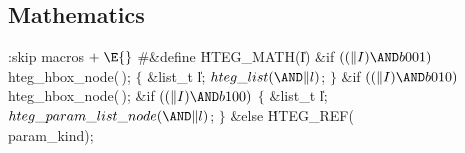 

\subsection{Mathematics}
\noindent
\Y\B\4:skip macros\X${}\mathrel+\E{}$\6
\8\#\&{define} \.{HTEG\_MATH}(\|I) \6
\&{if} ${}((\|I)\AND\\{b001}){}$\1\5
\\{hteg\_hbox\_node}(\,);\2\1\6
\4${}\{{}$\5
\&{list\_t} \|l;\5
${}\index{hteg list+\\{hteg\_list}}\\{hteg\_list}({\AND}\|l){}$;\5
${}\}{}$\2\6
\&{if} ${}((\|I)\AND\\{b010}){}$\1\5
\\{hteg\_hbox\_node}(\,);\2\6
\&{if} ${}((\|I)\AND\\{b100}){}$\5
\1${}\{{}$\5
\&{list\_t} \|l;\5
${}\index{hteg param list node+\\{hteg\_param\_list\_node}}\\{hteg\_param\_list\_node}({\AND}\|l){}$;\5
${}\}{}$\5
\2\&{else}\1\5
\.{HTEG\_REF}(\\{param\_kind});\2
\Y
\fi


